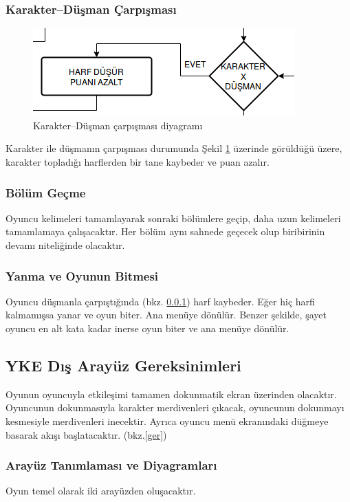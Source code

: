 \documentclass[12pt,a4paper]{article}
\begin{document}
   \subsubsection{Karakter--Düşman Çarpışması} \label{ssec:cxe}
   \begin{figure}
      \begin{center}
         \includegraphics{res/cxe.png}
         \caption{Karakter--Düşman çarpışması diyagramı}
         \label{fig:cxe}
      \end{center}
   \end{figure}
   Karakter ile düşmanın çarpışması durumunda Şekil \ref{fig:cxe} üzerinde görüldüğü üzere, karakter topladığı harflerden bir tane kaybeder ve puan azalır. 

   \subsubsection{Bölüm Geçme}
   Oyuncu kelimeleri tamamlayarak sonraki bölümlere geçip, daha uzun kelimeleri tamamlamaya çalışacaktır. Her bölüm aynı sahnede geçecek olup biribirinin devamı niteliğinde olacaktır.

   \subsubsection{Yanma ve Oyunun Bitmesi}
   Oyuncu düşmanla çarpıştığında (bkz. \ref{ssec:cxe}) harf kaybeder. Eğer hiç harfi kalmamışsa yanar ve oyun biter. Ana menüye dönülür. Benzer şekilde, şayet oyuncu en alt kata kadar inerse oyun biter ve ana menüye dönülür.

   \subsection{YKE Dış Arayüz Gereksinimleri}
   Oyunun oyuncuyla etkileşimi tamamen dokunmatik ekran üzerinden olacaktır. Oyuncunun dokunmasıyla karakter merdivenleri çıkacak, oyuncunun dokunmayı kesmesiyle merdivenleri inecektir. Ayrıca oyuncu menü ekranındaki düğmeye basarak akışı başlatacaktır. (bkz.\ref{ger})

   \subsubsection{Arayüz Tanımlaması ve Diyagramları} \label{ara}
   Oyun temel olarak iki arayüzden oluşacaktır.
\end{document}
